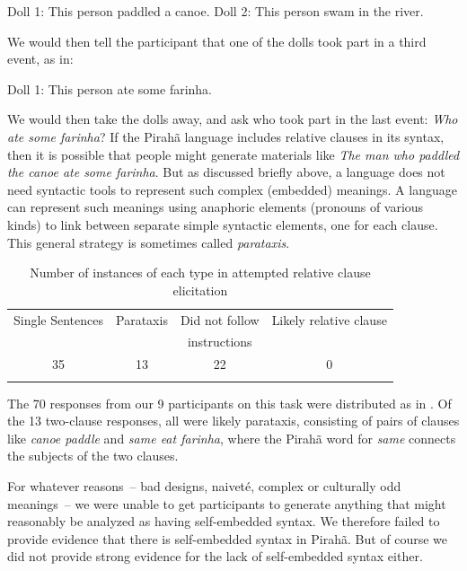 \documentclass[output=paper]{langscibook}
\begin{document}
\eal
\label{piraha_rcs}
\ex \label{piraha_rcs1} Doll 1: This person paddled a canoe.
\ex \label{piraha_rcs2} Doll 2: This person swam in the river.
\zl

We would then tell the participant that one of the dolls took part in a third event, as in:

\ea
\label{piraha_rcs3}
Doll 1: This person ate some farinha.
\z

We would then take the dolls away, and ask who took part in the last event: \textit{Who ate some farinha}?  If the Pirahã language includes relative clauses in its syntax, then it is possible that people might generate materials like \textit{The man who paddled the canoe ate some farinha}. But as discussed briefly above, a language does not need syntactic tools to represent such complex (embedded) meanings.  A language can represent such meanings using anaphoric elements (pronouns of various kinds) to link between separate simple syntactic elements, one for each clause.  This general strategy is sometimes called \textit{parataxis}.


\begin{table}
    \caption{Number of instances of each type in attempted relative clause elicitation}
    \label{gibson_table_1}
    \begin{tabular}{cccc}
    \lsptoprule
         Single Sentences & Parataxis & Did not follow  & Likely relative clause  \\
                          &           &  instructions   & \\\midrule
         35 & 13 & 22 & 0 \\
    \lspbottomrule
    \end{tabular}
\end{table}

The 70 responses from our 9 participants on this task were distributed as in .  Of the 13 two-clause responses, all were likely parataxis, consisting of pairs of clauses like \textit{canoe paddle} and \textit{same eat farinha}, where the Pirahã word for \textit{same} connects the subjects of the two clauses.

For whatever reasons~– bad designs, naiveté, complex or culturally odd meanings~– we were unable to get participants to generate anything that might reasonably be analyzed as having self-embedded syntax. We therefore failed to provide evidence that there is self-embedded syntax in Pirahã.  But of course we did not provide strong evidence for the lack of self-embedded syntax either.
\end{document}
